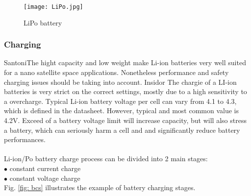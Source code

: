 \begin{figure}[h]
	\centering
	\texttt{[image: LiPo.jpg]}
	\caption{ LiPo battery \cite{12}}
	\label{fig: lipo}
\end{figure}



\subsubsection{Charging}

Santoni\cite{13}The hight capacity and low weight make Li-ion batteries very well suited for a nano satellite space applications. Nonetheless performance and safety charging issues should be taking into account. Insidor\cite{14} The chargie of a LI-ion batteries is very strict on the correct settings, mostly due to a high sensitivity to a overcharge. Typical Li-ion battery voltage per cell can vary from 4.1 to 4.3, which is defined in the datasheet. However, typical and most common value is 4.2V. Exceed of a battery voltage limit will increase capacity, but will also stress a battery, which can seriously harm a cell and and significantly reduce battery performances.\\ \\
Li-ion/Po battery charge process can be divided into 2 main stages:\\
$\bullet$ constant current charge\\
$\bullet$ constant voltage charge\\

Fig. \ref{fig: bcs} illustrates the example of battery charging stages.

